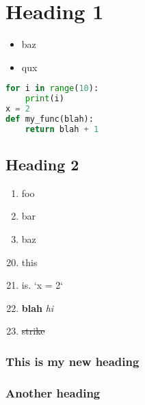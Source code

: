 \documentclass{article}
\begin{document}
\section{Heading 1}
\begin{itemize}
    \item baz
    \item qux
\end{itemize}

\begin{lstlisting}[language=python, style=myStyle]
for i in range(10):
    print(i)
x = 2
def my_func(blah):
    return blah + 1
\end{lstlisting}

\subsection{Heading 2}
\begin{enumerate}
    \setcounter{enumi}{0}
    \item  foo
    \item  bar
    \item  baz
\end{enumerate}

\begin{enumerate}
    \setcounter{enumi}{19}
    \item  this
    \item  is. `x = 2`
    \item  \textbf{blah} \textit{hi}
    \item  \sout{strike}
\end{enumerate}

\subsubsection{This is my new heading}
\subsubsection{Another heading}
\end{document}
